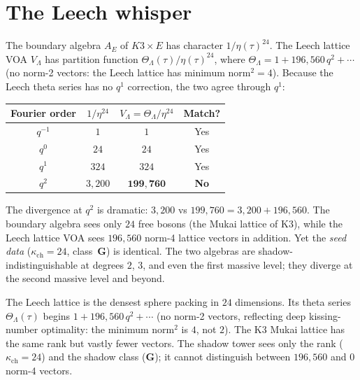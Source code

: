 \documentclass[11pt]{article}
\begin{document}
\section{The Leech whisper}
\label{sec:motivic-leech}

The boundary algebra $A_E$ of $K3 \times E$ has character $1/\eta(\tau)^{24}$. The Leech lattice VOA $V_\Lambda$ has partition function $\Theta_\Lambda(\tau)/\eta(\tau)^{24}$, where $\Theta_\Lambda = 1 + 196{,}560\, q^2 + \cdots$ (no norm-2 vectors: the Leech lattice has minimum norm$^2 = 4$). Because the Leech theta series has no $q^1$ correction, the two agree through $q^1$:
\begin{center}
\renewcommand{\arraystretch}{1.2}
\begin{tabular}{cccc}
 \toprule
 Fourier order & $1/\eta^{24}$ & $V_\Lambda = \Theta_\Lambda/\eta^{24}$ & Match? \\
 \midrule
 $q^{-1}$ & $1$ & $1$ & Yes \\
 $q^0$ & $24$ & $24$ & Yes \\
 $q^1$ & $324$ & $324$ & Yes \\
 $q^2$ & $3{,}200$ & $\mathbf{199{,}760}$ & \textbf{No} \\
 \bottomrule
\end{tabular}
\end{center}

The divergence at $q^2$ is dramatic: $3{,}200$ vs $199{,}760 = 3{,}200 + 196{,}560$. The boundary algebra sees only $24$ free bosons (the Mukai lattice of K3), while the Leech lattice VOA sees $196{,}560$ norm-4 lattice vectors in addition. Yet the \emph{seed data} ($\kappa_{\mathrm{ch}} = 24$, class~$\mathbf{G}$) is identical. The two algebras are shadow-indistinguishable at degrees $2$, $3$, and even the first massive level; they diverge at the second massive level and beyond.

The Leech lattice is the densest sphere packing in $24$ dimensions. Its theta series $\Theta_\Lambda(\tau)$ begins $1 + 196{,}560\, q^2 + \cdots$ (no norm-2 vectors, reflecting deep kissing-number optimality: the minimum norm$^2$ is $4$, not $2$). The K3 Mukai lattice has the same rank but vastly fewer vectors. The shadow tower sees only the rank ($\kappa_{\mathrm{ch}} = 24$) and the shadow class ($\mathbf{G}$); it cannot distinguish between $196{,}560$ and $0$ norm-4 vectors.
\end{document}
